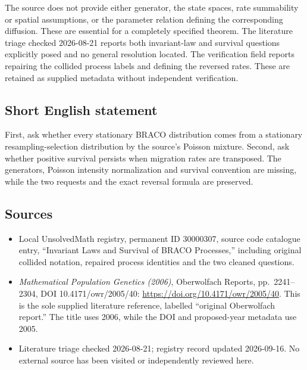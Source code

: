 \documentclass[11pt]{article}
\begin{document}
The source does not provide either generator, the state spaces, rate summability or spatial assumptions, or the parameter relation defining the corresponding diffusion. These are essential for a completely specified theorem. The literature triage checked 2026-08-21 reports both invariant-law and survival questions explicitly posed and no general resolution located. The verification field reports repairing the collided process labels and defining the reversed rates. These are retained as supplied metadata without independent verification.
\subsection{Short English statement}
First, ask whether every stationary BRACO distribution comes from a stationary resampling-selection distribution by the source's Poisson mixture. Second, ask whether positive survival persists when migration rates are transposed. The generators, Poisson intensity normalization and survival convention are missing, while the two requests and the exact reversal formula are preserved.
\subsection{Sources}
\begin{itemize}
\item Local UnsolvedMath registry, permanent ID 30000307, source code catalogue entry, ``Invariant Laws and Survival of BRACO Processes,'' including original collided notation, repaired process identities and the two cleaned questions.
\item \emph{Mathematical Population Genetics (2006)}, Oberwolfach Reports, pp.\ 2241--2304, DOI 10.4171/owr/2005/40: \url{https://doi.org/10.4171/owr/2005/40}. This is the sole supplied literature reference, labelled ``original Oberwolfach report.'' The title uses 2006, while the DOI and proposed-year metadata use 2005.
\item Literature triage checked 2026-08-21; registry record updated 2026-09-16. No external source has been visited or independently reviewed here.
\end{itemize}
\end{document}
